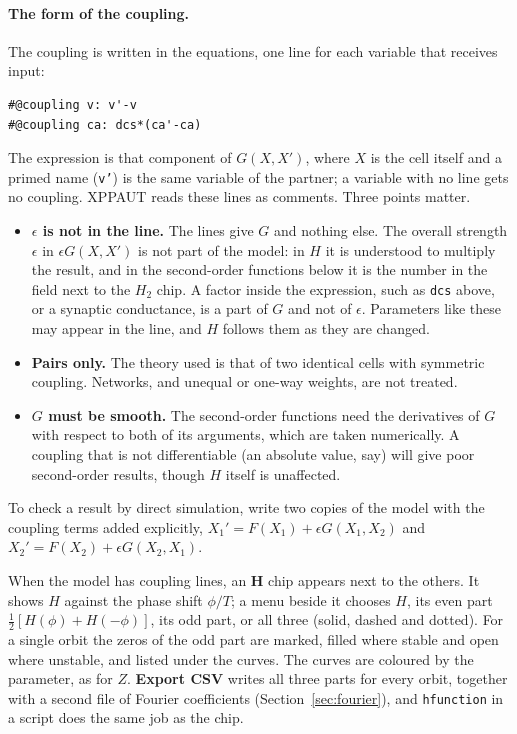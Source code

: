 \documentclass[11pt,a4paper]{article}
\newcommand{\XPP}{\textsf{XPPAUT}}
\newcommand{\ui}[1]{\textsf{\textbf{#1}}}          %
\begin{document}
\paragraph{The form of the coupling.} The coupling is written in the equations, one line for each variable that receives input:
\begin{lstlisting}
#@coupling v: v'-v
#@coupling ca: dcs*(ca'-ca)
\end{lstlisting}
\noindent The expression is that component of $G(X,X')$, where $X$ is the cell itself and a primed name (\texttt{v'}) is the same variable of the partner; a variable with no line gets no coupling. \XPP{} reads these lines as comments. Three points matter.
\begin{itemize}
  \item \textbf{$\epsilon$ is not in the line.} The lines give $G$ and nothing else. The overall strength $\epsilon$ in $\epsilon G(X,X')$ is not part of the model: in $H$ it is understood to multiply the result, and in the second-order functions below it is the number in the field next to the $H_2$ chip. A factor inside the expression, such as \texttt{dcs} above, or a synaptic conductance, is a part of $G$ and not of $\epsilon$. Parameters like these may appear in the line, and $H$ follows them as they are changed.
  \item \textbf{Pairs only.} The theory used is that of two identical cells with symmetric coupling. Networks, and unequal or one-way weights, are not treated.
  \item \textbf{$G$ must be smooth.} The second-order functions need the derivatives of $G$ with respect to both of its arguments, which are taken numerically. A coupling that is not differentiable (an absolute value, say) will give poor second-order results, though $H$ itself is unaffected.
\end{itemize}

\noindent To check a result by direct simulation, write two copies of the model with the coupling terms added explicitly, $X_1'=F(X_1)+\epsilon G(X_1,X_2)$ and $X_2'=F(X_2)+\epsilon G(X_2,X_1)$.

When the model has coupling lines, an \ui{H} chip appears next to the others. It shows $H$ against the phase shift $\phi/T$; a menu beside it chooses $H$, its even part $\tfrac12[H(\phi)+H(-\phi)]$, its odd part, or all three (solid, dashed and dotted). For a single orbit the zeros of the odd part are marked, filled where stable and open where unstable, and listed under the curves. The curves are coloured by the parameter, as for $Z$. \ui{Export CSV} writes all three parts for every orbit, together with a second file of Fourier coefficients (Section~\ref{sec:fourier}), and \texttt{hfunction} in a script does the same job as the chip.
\end{document}
